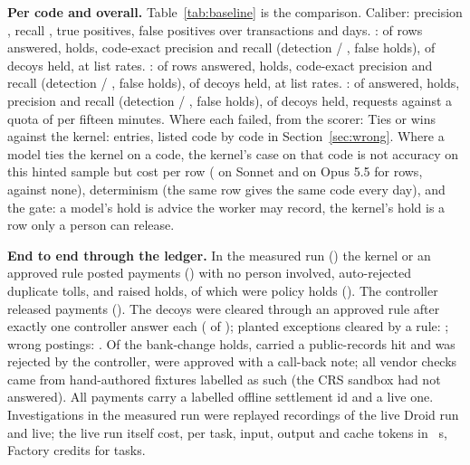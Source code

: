 \documentclass[conference]{IEEEtran}
\begin{document}
\textbf{Per code and overall.} Table~\ref{tab:baseline} is the comparison. Caliber: precision \overallP, recall \overallR, \overallTP{} true positives, \overallFP{} false positives over \txMatched{} transactions and \dayReached{} days. \sonnetLabel: \sonnetAnswered{} of \sonnetRows{} rows answered, \sonnetHolds{} holds, code-exact precision \sonnetP{} and recall \sonnetR{} (detection \sonnetDetP{} / \sonnetDetR, \sonnetDetFP{} false holds), \sonnetDecoysHeld{} of \baseDecoys{} decoys held, \sonnetCostUsd{} at list rates. \opusLabel: \opusAnswered{} of \opusRows{} rows answered, \opusHolds{} holds, code-exact precision \opusP{} and recall \opusR{} (detection \opusDetP{} / \opusDetR, \opusDetFP{} false holds), \opusDecoysHeld{} of \baseDecoys{} decoys held, \opusCostUsd{} at list rates. \asiLabel: \asiAnswered{} of \asiRows{} answered, \asiHolds{} holds, precision \asiP{} and recall \asiR{} (detection \asiDetP{} / \asiDetR, \asiDetFP{} false holds), \asiDecoysHeld{} of \baseDecoys{} decoys held, \asiRequests{} requests against a quota of \asiQuotaWindow{} per fifteen minutes. Where each failed, from the scorer: \sonnetFailure{} \opusFailure{} \asiFailure{} Ties or wins against the kernel: \tiesOrWinsCount{} entries, listed code by code in Section~\ref{sec:wrong}. Where a model ties the kernel on a code, the kernel's case on that code is not accuracy on this hinted sample but cost per row (\sonnetCostUsd{} on Sonnet and \opusCostUsd{} on Opus 5.5 for \sonnetRows{} rows, against none), determinism (the same row gives the same code every day), and the gate: a model's hold is advice the worker may record, the kernel's hold is a row only a person can release.

\textbf{End to end through the ledger.} In the measured run (\factsAsOf) the kernel or an approved rule posted \autoPaidCount{} payments (\autoPaidUsd) with no person involved, auto-rejected \autoRejectedFacts{} duplicate tolls, and raised \holdsFacts{} holds, of which \limitHoldsCount{} were policy holds (\limitHoldsUsd). The controller released \ctrlReleasedCount{} payments (\ctrlReleasedUsd). The \nDecoys{} decoys were cleared through an approved rule after exactly one controller answer each (\decoysOneAnswer{} of \nDecoys); planted exceptions cleared by a rule: \plantedClearedByRule; wrong postings: \measWrong. Of the \vcHolds{} bank-change holds, \vcHitRejected{} carried a public-records hit and was rejected by the controller, \vcCleanApproved{} were approved with a call-back note; all \vcFixture{} vendor checks came from hand-authored fixtures labelled as such (the CRS sandbox had not answered). All \settleOffline{} payments carry a labelled offline settlement id and \settleLive{} a live one. Investigations in the measured run were \investReplayed{} replayed recordings of the live Droid run and \investLive{} live; the live run itself cost, per task, \droidAvgIn{} input, \droidAvgOut{} output and \droidAvgCache{} cache tokens in \droidAvgSec~s, \droidCredits{} Factory credits for \droidTasks{} tasks.
\end{document}
